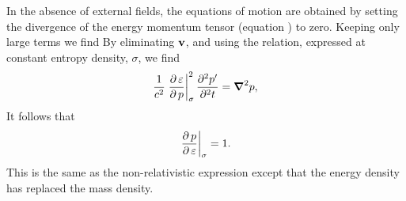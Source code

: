 In the absence of external fields, the equations of motion are obtained by setting the 
 divergence of the energy momentum tensor (equation ) to zero.
Keeping only large terms we find
By eliminating $\textbf{v}$, %
and using the relation, expressed at constant entropy density, $\sigma$,
we find
\begin{align}
 \frac{1}{c^2} \left.{\frac{\operatorname{\partial} \varepsilon}{\operatorname{\partial} p}}\right|_{\sigma}^2\frac{\partial^2 p^\prime}{\partial^2 t} = \mbox{\boldmath $\nabla$}^2 p,
\end{align}
It follows that\cite{LandauBook,Taub1978} %
\begin{align}
   \left.{\frac{\operatorname{\partial} p}{\operatorname{\partial} \varepsilon}}\right|_{\sigma} = 1. \label{eqn:soundspeed}
\end{align}
This is the same as the non-relativistic expression except that the energy density has replaced the mass density.

